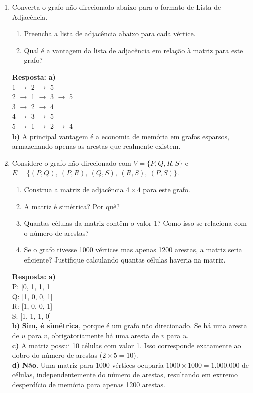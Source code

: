 \documentclass[12pt]{article}
\newcommand{\quadro}[1]{\vspace{0.2cm}\begin{tcolorbox}[colback=green!5, colframe=forestgreen, boxrule=0.5pt, arc=0pt] \textbf{Resposta:} #1 \end{tcolorbox}}
\begin{document}
\begin{enumerate}[label=\arabic*), leftmargin=1.5cm, itemsep=0.8cm]
\item Converta o grafo não direcionado abaixo para o formato de Lista de Adjacência.
\begin{enumerate}[label=\alph*)]
    \item Preencha a lista de adjacência abaixo para cada vértice.
    \item Qual é a vantagem da lista de adjacência em relação à matriz para este grafo?
\end{enumerate}
\quadro{
\textbf{a)} \\
1 $\to$ 2 $\to$ 5 \\
2 $\to$ 1 $\to$ 3 $\to$ 5 \\
3 $\to$ 2 $\to$ 4 \\
4 $\to$ 3 $\to$ 5 \\
5 $\to$ 1 $\to$ 2 $\to$ 4 \\
\textbf{b)} A principal vantagem é a economia de memória em grafos esparsos, armazenando apenas as arestas que realmente existem.
}

\item Considere o grafo não direcionado com $V = \{P, Q, R, S\}$ e $E = \{(P,Q),\ (P,R),\ (Q,S),\ (R,S),\ (P,S)\}$.
\begin{enumerate}[label=\alph*)]
    \item Construa a matriz de adjacência $4 \times 4$ para este grafo.
    \item A matriz é simétrica? Por quê?
    \item Quantas células da matriz contêm o valor 1? Como isso se relaciona com o número de arestas?
    \item Se o grafo tivesse 1000 vértices mas apenas 1200 arestas, a matriz seria eficiente? Justifique calculando quantas células haveria na matriz.
\end{enumerate}
\quadro{
\textbf{a)} \\
P: [0, 1, 1, 1] \\
Q: [1, 0, 0, 1] \\
R: [1, 0, 0, 1] \\
S: [1, 1, 1, 0] \\
\textbf{b)} \textbf{Sim, é simétrica}, porque é um grafo não direcionado. Se há uma aresta de $u$ para $v$, obrigatoriamente há uma aresta de $v$ para $u$. \\
\textbf{c)} A matriz possui 10 células com valor 1. Isso corresponde exatamente ao dobro do número de arestas ($2 \times 5 = 10$). \\
\textbf{d)} \textbf{Não}. Uma matriz para 1000 vértices ocuparia $1000 \times 1000 = 1.000.000$ de células, independentemente do número de arestas, resultando em extremo desperdício de memória para apenas 1200 arestas.
}


\end{enumerate}
\end{document}
